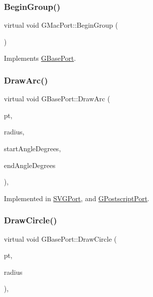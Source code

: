 \subsubsection{\texorpdfstring{Begin\+Group()}{BeginGroup()}}
{\footnotesize\ttfamily virtual void G\+Mac\+Port\+::\+Begin\+Group (\begin{DoxyParamCaption}{ }\end{DoxyParamCaption})\hspace{0.3cm}{\ttfamily [virtual]}}



Implements \mbox{\hyperlink{class_g_base_port_ac7aafbb728fe8b61dec2c3f163e2c894}{G\+Base\+Port}}.

\mbox{\label{class_g_base_port_af9375a9f4cd1bc94ac70eb71c437835a}} 
\subsubsection{\texorpdfstring{Draw\+Arc()}{DrawArc()}}
{\footnotesize\ttfamily virtual void G\+Base\+Port\+::\+Draw\+Arc (\begin{DoxyParamCaption}\item[{const \mbox{\hyperlink{class_g_point}{G\+Point}} \&}]{pt,  }\item[{const int}]{radius,  }\item[{const double}]{start\+Angle\+Degrees,  }\item[{const double}]{end\+Angle\+Degrees }\end{DoxyParamCaption})\hspace{0.3cm}{\ttfamily [pure virtual]}, {\ttfamily [inherited]}}



Implemented in \mbox{\hyperlink{class_s_v_g_port_aa849012cbcbb27a9db820cee968093c9}{S\+V\+G\+Port}}, and \mbox{\hyperlink{class_g_postscript_port_a9930f5d5cf8d6efb04af048a3ab72a3f}{G\+Postscript\+Port}}.

\mbox{\label{class_g_base_port_a7dbdd13c9a8f60537e7915a7991ab0f0}} 
\subsubsection{\texorpdfstring{Draw\+Circle()}{DrawCircle()}}
{\footnotesize\ttfamily virtual void G\+Base\+Port\+::\+Draw\+Circle (\begin{DoxyParamCaption}\item[{const \mbox{\hyperlink{class_g_point}{G\+Point}} \&}]{pt,  }\item[{const int}]{radius }\end{DoxyParamCaption})\hspace{0.3cm}{\ttfamily [pure virtual]}, {\ttfamily [inherited]}}



